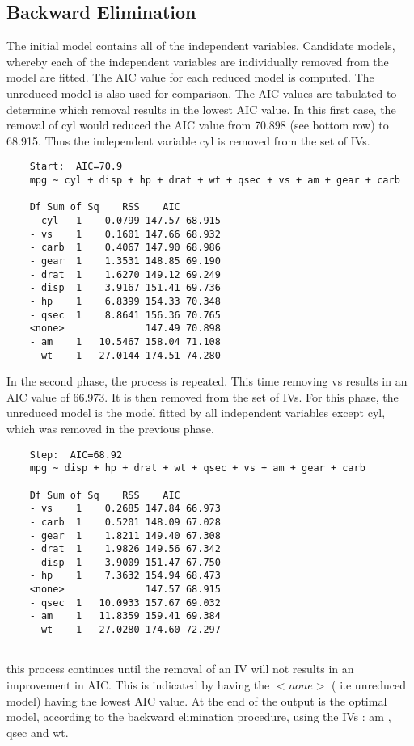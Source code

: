 \documentclass[a4paper,12pt]{article}
\begin{document}
\subsection{Backward Elimination}
The initial model contains all of the independent variables. Candidate models, whereby each of the independent variables are individually removed from the model are fitted. The AIC value for each reduced model is computed. The unreduced model is also used for comparison. The AIC values are tabulated to determine which removal results in the lowest AIC value. In this first case, the removal of cyl would reduced the AIC value from 70.898 (see bottom row) to 68.915. Thus the independent variable cyl is removed from the set of IVs.
\begin{framed}
	\begin{verbatim}
	Start:  AIC=70.9
	mpg ~ cyl + disp + hp + drat + wt + qsec + vs + am + gear + carb
	
	Df Sum of Sq    RSS    AIC
	- cyl   1    0.0799 147.57 68.915
	- vs    1    0.1601 147.66 68.932
	- carb  1    0.4067 147.90 68.986
	- gear  1    1.3531 148.85 69.190
	- drat  1    1.6270 149.12 69.249
	- disp  1    3.9167 151.41 69.736
	- hp    1    6.8399 154.33 70.348
	- qsec  1    8.8641 156.36 70.765
	<none>              147.49 70.898
	- am    1   10.5467 158.04 71.108
	- wt    1   27.0144 174.51 74.280
	\end{verbatim}
\end{framed}
In the second phase, the process is repeated. This time removing vs results in an AIC value of 66.973. It is then removed from the set of IVs. For this phase, the unreduced model is the model fitted by all independent variables except cyl, which was removed in the previous phase.
\begin{framed}
	\begin{verbatim}
	Step:  AIC=68.92
	mpg ~ disp + hp + drat + wt + qsec + vs + am + gear + carb
	
	Df Sum of Sq    RSS    AIC
	- vs    1    0.2685 147.84 66.973
	- carb  1    0.5201 148.09 67.028
	- gear  1    1.8211 149.40 67.308
	- drat  1    1.9826 149.56 67.342
	- disp  1    3.9009 151.47 67.750
	- hp    1    7.3632 154.94 68.473
	<none>              147.57 68.915
	- qsec  1   10.0933 157.67 69.032
	- am    1   11.8359 159.41 69.384
	- wt    1   27.0280 174.60 72.297
	
	\end{verbatim}
\end{framed}
this process continues until the removal of an IV will not results in an improvement in AIC. This is indicated by having the $<none>$ ( i.e unreduced model) having the lowest AIC value. At the end of the output is the optimal model, according to the backward elimination procedure, using the IVs : am , qsec and wt.
\end{document}
